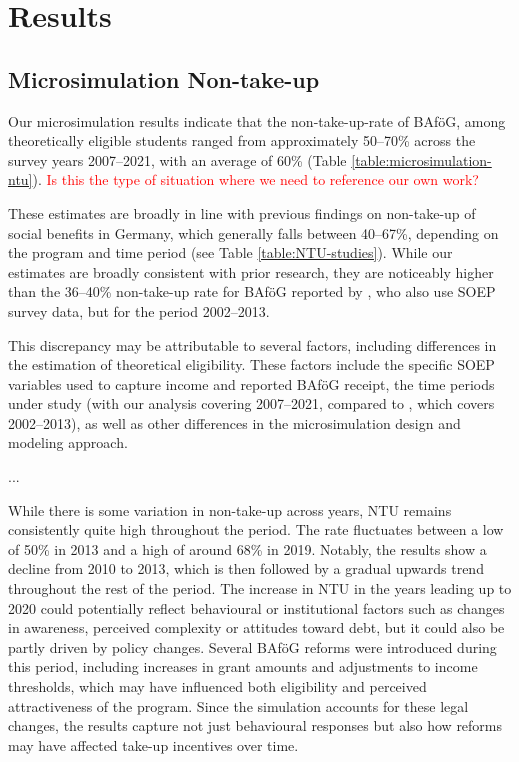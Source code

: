 %
%



\section{Results}

\subsection{Microsimulation Non-take-up}
Our microsimulation results indicate that the non-take-up-rate of BAföG, among theoretically eligible students ranged from approximately 50--70\% across the survey years 2007--2021, with an average of 60\%  (Table \ref{table:microsimulation-ntu}). \textcolor{red}{Is this the type of situation where we need to reference our own work?}

These estimates are broadly in line with previous findings on non-take-up of social benefits in Germany, which generally falls between 40--67\%, depending on the program and time period (see Table \ref{table:NTU-studies}). 
While our estimates are broadly consistent with prior research, they are noticeably higher than the 36--40\% non-take-up rate for BAföG reported by \cite{herber_non-take-up_2019}, who also use SOEP survey data, but for the period 2002--2013.

This discrepancy may be attributable to several factors, including differences in the estimation of theoretical eligibility. These factors include the specific SOEP variables used to capture income and reported BAföG receipt, the time periods under study (with our analysis covering 2007--2021, compared to \cite{herber_non-take-up_2019}, which covers 2002--2013), as well as other differences in the microsimulation design and modeling approach.

...

While there is some variation in non-take-up across years, NTU remains consistently quite high throughout the period. The rate fluctuates between a low of 50\% in 2013 and a high of around 68\% in 2019. Notably, the results show a decline from 2010 to 2013, which is then followed by a gradual upwards trend throughout the rest of the period. The increase in NTU in the years leading up to 2020 could potentially reflect behavioural or institutional factors such as changes in awareness, perceived complexity or attitudes toward debt, but it could also be partly driven by policy changes. Several BAföG reforms were introduced during this period, including increases in grant amounts and adjustments to income thresholds, which may have influenced both eligibility and perceived attractiveness of the program. Since the simulation accounts for these legal changes, the results capture not just behavioural responses but also how reforms may have affected take-up incentives over time.

